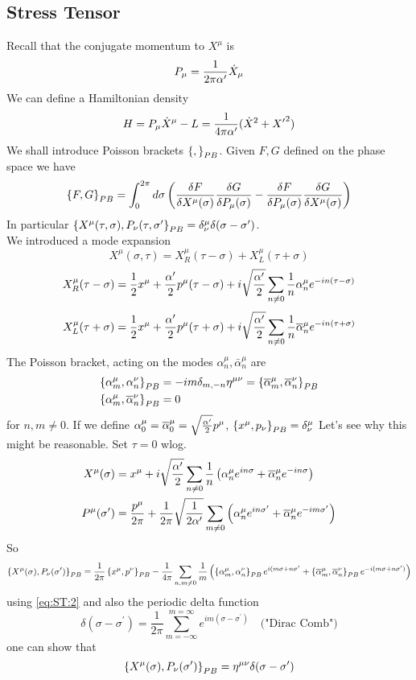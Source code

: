 \documentclass{article}
\begin{document}
\subsection{Stress Tensor}
Recall that the conjugate momentum to $X^\mu$ is 
\[
P_\mu = \frac{1}{2\pi\cst} \dot{X}_\mu
\]
We can define a Hamiltonian density 
\[
H = P_\mu \dot{X}^\mu - L = \frac{1}{4\pi\cst}(\dot{X}^2 + {X^\prime}^2)
\]
We shall introduce Poisson brackets $\pb[]{}$. Given $F,G$ defined on the phase space we have 
\[
\pb[F]{G} = \int_0^{2\pi} d\sigma \left( \frac{\delta F}{\delta X^\mu(\sigma)} \frac{\delta G}{\delta P_\mu(\sigma)} - \frac{\delta F}{\delta P_\mu(\sigma)}\frac{\delta G}{\delta X^\mu(\sigma)} \right) 
\]
In particular $\pb[X^\mu(\tau,\sigma)]{P_\nu(\tau,\sigma^\prime}=\delta^\mu_\nu \delta(\sigma-\sigma^\prime)$.\\
We introduced a mode expansion 
\[
X^\mu(\sigma,\tau) = X^\mu_R(\tau-\sigma) + X^\mu_L(\tau+\sigma)
\]
\[
X^\mu_R(\tau-\sigma) = \frac{1}{2} x^\mu + \frac{\cst}{2} p^\mu (\tau-\sigma) + i\sqrt{\frac{\cst}{2}} \sum_{n\neq0} \frac{1}{n} \alpha^\mu_n e^{-in(\tau-\sigma)}
\]
\[
X^\mu_L(\tau+\sigma) = \frac{1}{2} x^\mu + \frac{\cst}{2} p^\mu (\tau+\sigma) + i\sqrt{\frac{\cst}{2}} \sum_{n\neq0} \frac{1}{n} \bar{\alpha}^\mu_n e^{-in(\tau+\sigma)}
\]
The Poisson bracket, acting on the modes $\alpha^\mu_n, \bar{\alpha}^\mu_n$ are 
\begin{align} \label{eq:ST:2}
\pb[\alpha^\mu_m]{\alpha^\nu_n} &= -im \delta_{m,-n} \eta^{\mu\nu} = \pb[\bar{\alpha}^\mu_m]{\bar{\alpha}^\nu_n} \\
\pb[\alpha^\mu_m]{\bar{\alpha}^\nu_n} &= 0
\end{align}
for $n,m\neq0$. If we define $\alpha^\mu_0=\bar{\alpha}^\mu_0 = \sqrt{\frac{\cst}{2}}p^\mu$, $\pb[x^\mu]{p_\nu}=\delta^\mu_\nu$
Let's see why this might be reasonable. Set $\tau=0$ wlog. 
\begin{align*}
X^\mu(\sigma) &= x^\mu + i\sqrt{\frac{\cst}{2}} \sum_{n\neq0} \frac{1}{n} \left( \alpha^\mu_n e^{in\sigma} + \bar{\alpha}^\mu_n e^{-in\sigma} \right) \\ 
P^\mu(\sigma^\prime) &= \frac{p^\mu}{2\pi} + \frac{1}{2\pi}\sqrt{\frac{1}{2\cst}} \sum_{m\neq0} \left( \alpha^\mu_n e^{in\sigma^\prime} + \bar{\alpha}^\mu_n e^{-im\sigma^\prime} \right)
\end{align*}
So 
\[
\pb[X^\mu(\sigma)]{P_\nu(\sigma^\prime)} = \frac{1}{2\pi} \pb[x^\mu]{p^\nu} - \frac{1}{4\pi} \sum_{n,m\neq0} \frac{1}{m} \left( \pb[\alpha^\mu_m]{\alpha^\nu_n} e^{i(m\sigma+n\sigma^\prime}+\pb[\bar{\alpha}^\mu_m]{\bar{\alpha}^\nu_n}e^{-i(m\sigma+n\sigma^\prime)} \right)
\]
using \ref{eq:ST:2} and also the periodic delta function 
\[
\delta(\sigma-\sigma^\prime)=\frac{1}{2\pi} \sum_{m=-\infty}^{m=\infty} e^{im(\sigma-\sigma^\prime)} \quad \text{("Dirac Comb")}
\]
one can show that 
\[
\pb[X^\mu(\sigma)]{P_\nu(\sigma^\prime)} = \eta^{\mu\nu} \delta(\sigma-\sigma^\prime)
\]
\end{document}

